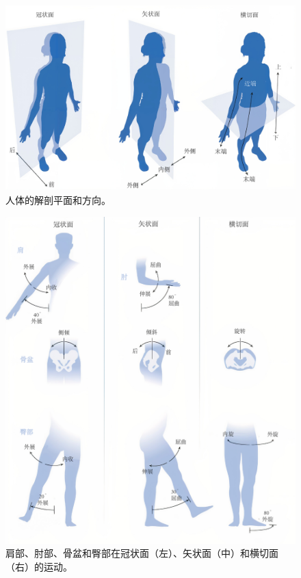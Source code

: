 \begin{figure}[!htb]
	\centering
	\includegraphics[width=1.0\linewidth]{chap1/1_15}
	\caption{人体的解剖平面和方向。 \label{fig:1_15}}
\end{figure}


\begin{figure}[!htb]
	\centering
	\includegraphics[width=1.0\linewidth]{chap1/1_16}
	\caption{肩部、肘部、骨盆和臀部在冠状面（左）、矢状面（中）和横切面（右）的运动。 \label{fig:1_16}}
\end{figure}


